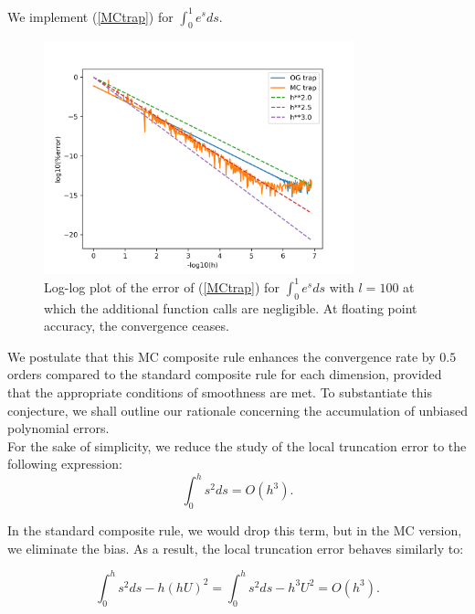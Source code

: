 \documentclass[a4paper,12pt]{article}
\begin{document}
\begin{pythonn}
    We implement (\ref{MCtrap}) for $\int_{0}^{1}e^{s}ds$.
    \vspace*{0.5cm}

    \begin{figure}[h!]
        \centering
        \includegraphics[width=0.8\textwidth]{plots/MCtrap.png}
        \caption{Log-log plot of the error of (\ref{MCtrap}) for
        $\int_{0}^{1}e^{s}ds$ with $l=100$ at which the additional function
        calls are negligible. At floating point accuracy,
        the convergence ceases.
        }
        \label{fig:MCtrap}
    \end{figure}
\end{pythonn}

We postulate that this MC composite rule enhances the convergence
rate by $0.5$ orders compared to the standard composite rule for each dimension,
provided that the appropriate conditions of smoothness are met.
To substantiate this conjecture, we shall outline our rationale concerning
the accumulation of unbiased polynomial errors.\\

For the sake of simplicity, we reduce the study of the local truncation error
to the following expression:
\begin{equation}
    \int_{0}^{h} s^{2}ds = O(h^{3}).
\end{equation}

In the standard composite rule, we would drop this term, but in
the MC version, we eliminate the bias. As a result,
the local truncation error behaves similarly to:

\begin{equation}
    \int_{0}^{h} s^{2}ds- h(hU)^{2} = \int_{0}^{h} s^{2}ds- h^{3}U^{2} = O(h^{3}).
\end{equation}
\end{document}
